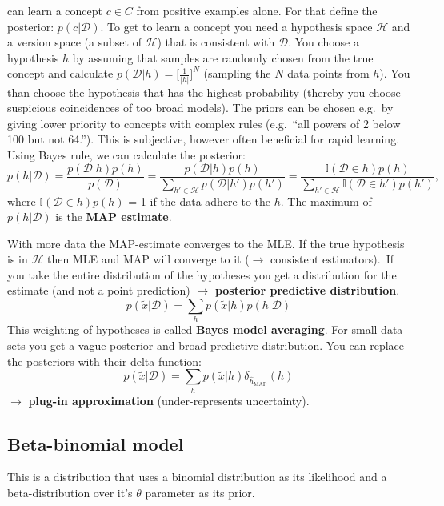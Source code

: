 \documentclass[
]{book}
\begin{document}
can learn a concept \(c \in C\) from positive examples alone. For that
define the posterior: \(p(c|\mathcal{D})\). To get to learn a concept you
need a hypothesis space \(\mathcal{H}\) and a version space (a subset of
\(\mathcal{H}\)) that is consistent with \(\mathcal{D}\). You choose a
hypothesis \(h\) by assuming that samples are randomly chosen from the
true concept and calculate
\(p(\mathcal{D}|h)=\lbrack \frac{1}{|h|}\rbrack^N\) (sampling the \(N\) data
points from \(h\)). You than choose the hypothesis that has the highest
probability (thereby you choose suspicious coincidences of too broad
models). The priors can be chosen e.g.~by giving lower priority to
concepts with complex rules (e.g.~``all powers of 2 below 100 but not
64.''). This is subjective, however often beneficial for rapid learning.\\
Using Bayes rule, we can calculate the posterior:
\[p(h|\mathcal{D}) =\dfrac{p(\mathcal{D}|h)p(h)}{p(\mathcal{D})} =  \dfrac{p(\mathcal{D}|h)p(h)}{\sum_{h' \in \mathcal{H}}p(\mathcal{D}|h')p(h')}=\dfrac{\mathbb{I}(\mathcal{D} \in h)p(h)}{\sum_{h' \in \mathcal{H}}\mathbb{I}(\mathcal{D} \in h')p(h')},\]
where \(\mathbb{I}(\mathcal{D} \in h)p(h)\) = 1 if the data adhere to the
\(h\). The maximum of \(p(h|\mathcal{D})\) is the \textbf{MAP estimate}.

With more data the MAP-estimate converges to the MLE. If the true
hypothesis is in \(\mathcal{H}\) then MLE and MAP will converge to it
(\(\rightarrow\) consistent estimators).~If you take the entire
distribution of the hypotheses you get a distribution for the estimate
(and not a point prediction) \(\rightarrow\) \textbf{posterior predictive
distribution}.
\[p(\tilde{x}|\mathcal{D}) = \sum_h p(\tilde{x}|h)p(h|\mathcal{D})\]
This weighting of hypotheses is called \textbf{Bayes model averaging}. For
small data sets you get a vague posterior and broad predictive
distribution. You can replace the posteriors with their delta-function:
\[p(\tilde{x}|\mathcal{D}) = \sum_h p(\tilde{x}|h)\delta_{\hat{h}_{\text{MAP}}}(h)\]
\(\rightarrow\) \textbf{plug-in approximation} (under-represents uncertainty).

\hypertarget{beta-binomial-model}{%
\subsection{Beta-binomial model}\label{beta-binomial-model}}

This is a distribution that uses a binomial distribution as its
likelihood and a beta-distribution over it's \(\theta\) parameter as its
prior.
\end{document}
